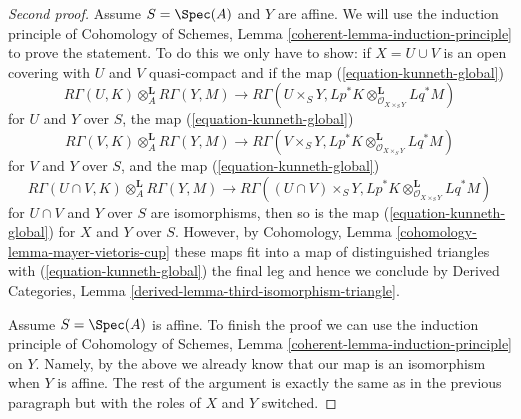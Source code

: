 \begin{proof}[Second proof]
\medskip\noindent
Assume $S = \Spec(A)$ and $Y$ are affine. We will use the induction
principle of
Cohomology of Schemes, Lemma \ref{coherent-lemma-induction-principle}
to prove the statement. To do this we only have to show:
if $X = U \cup V$ is an open covering with $U$ and $V$ quasi-compact
and if the map (\ref{equation-kunneth-global})
$$
R\Gamma(U, K) \otimes_A^\mathbf{L} R\Gamma(Y, M)
\longrightarrow
R\Gamma(U \times_S Y,
Lp^*K \otimes_{\mathcal{O}_{X \times_S Y}}^\mathbf{L} Lq^*M)
$$
for $U$ and $Y$ over $S$, the map (\ref{equation-kunneth-global})
$$
R\Gamma(V, K) \otimes_A^\mathbf{L} R\Gamma(Y, M)
\longrightarrow
R\Gamma(V \times_S Y,
Lp^*K \otimes_{\mathcal{O}_{X \times_S Y}}^\mathbf{L} Lq^*M)
$$
for $V$ and $Y$ over $S$, and the map (\ref{equation-kunneth-global})
$$
R\Gamma(U \cap V, K) \otimes_A^\mathbf{L} R\Gamma(Y, M)
\longrightarrow
R\Gamma((U \cap V) \times_S Y,
Lp^*K \otimes_{\mathcal{O}_{X \times_S Y}}^\mathbf{L} Lq^*M)
$$
for $U \cap V$ and $Y$ over $S$ are isomorphisms, then so is the map
(\ref{equation-kunneth-global}) for $X$ and $Y$ over $S$.
However, by Cohomology, Lemma \ref{cohomology-lemma-mayer-vietoris-cup}
these maps fit into a map of distinguished triangles with
(\ref{equation-kunneth-global}) the final leg and hence we conclude
by Derived Categories, Lemma \ref{derived-lemma-third-isomorphism-triangle}.

\medskip\noindent
Assume $S = \Spec(A)$ is affine. To finish the proof we can use the
induction principle of
Cohomology of Schemes, Lemma \ref{coherent-lemma-induction-principle}
on $Y$. Namely, by the above we already know that our map is
an isomorphism when $Y$ is affine. The rest of the argument is
exactly the same as in the previous paragraph but with the roles of
$X$ and $Y$ switched.
\end{proof}

